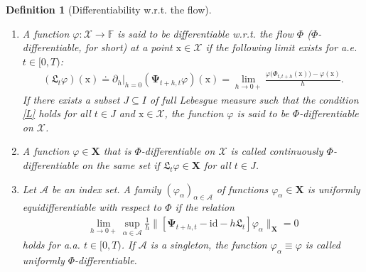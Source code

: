 \documentclass[sn-mathphys-num]{sn-jnl}
\numberwithin{equation}{section}
\theoremstyle{mythm}
\theoremstyle{mydef}
\newtheorem{definition}[proposition]{Definition}
\renewcommand{\phi}{\varphi}
\newcommand{\id}{\mathrm{id}}
\begin{document}
\begin{definition}[Differentiability w.r.t. the flow]\label{def:metr_differentiable}
~
\begin{enumerate}
    \item A function $\phi\colon \mathcal{X} \to \mathbb{F}$ is said to be differentiable w.r.t. the flow $\Phi$ (\emph{$\Phi$-differentiable}, for short) at a point $\mathrm{x} \in \mathcal{X}$ if the following limit exists for a.e. $t \in [0,T)$:
    \begin{align}\label{L}
        ({\mathfrak{L}_t{\phi}})(\mathrm{x}) \doteq \partial_h \big|_{h=0}  \left(\bm{\Psi}_{t+h, t} \phi\right)(\mathrm{x}) = \lim_{h \to 0+}\frac{\phi\big(\Phi_{t, t+h}(\mathrm{x})\big) - \phi(\mathrm{x})}{h}.
    \end{align}
    If there exists a subset $J \subseteq I$ of full Lebesgue measure such that the condition \eqref{L} holds for all $t \in J$ and  $\mathrm{x} \in \mathcal{X}$, the function $\phi$ is said to be $\Phi$-differentiable on $\mathcal{X}$.

    \item A function $\phi \in \bm{X}$ that is $\Phi$-differentiable on $\mathcal{X}$ is called \emph{continuously $\Phi$-differentiable} on the same set if $\mathfrak{L}_t{\phi} \in \bm{X}$ for all $t \in J$.

    \item Let $\mathcal{A}$ be an index set. A family $(\phi_\alpha)_{\alpha \in \mathcal{A}}$ of functions $\phi_\alpha \in \bm{X}$ is \emph{uniformly equidifferentiable with respect to $\Phi$} if the relation
    \begin{gather}
        \lim_{h \to 0+}\sup_{\alpha \in \mathcal{A}}\frac{1}{h}\Big\|\left[\bm{\Psi}_{t+h, t}-\id - h\mathfrak{L}_t\right]\phi_\alpha\Big\|_{\bm{X}} = 0
    \end{gather}
    holds for a.a. $t \in [0,T)$. If $\mathcal{A}$ is a singleton, the function $\phi_\alpha \equiv \phi$ is called \emph{uniformly $\Phi$-differentiable}.
\end{enumerate}
\end{definition}
\end{document}
